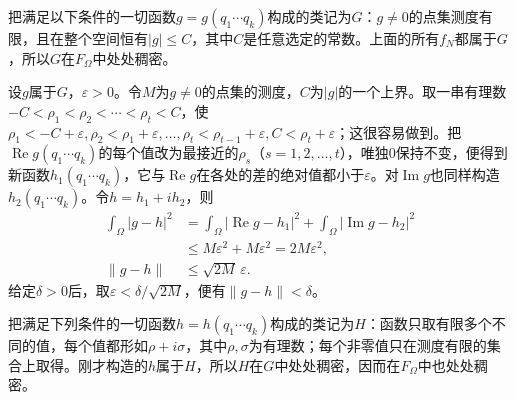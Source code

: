 \documentclass[fontsize=13pt,twoside,openany,headings=normal,parskip=false,bookmarkpackage=false,DIV=calc]{scrbook}
\begin{document}
把满足以下条件的一切函数$g=g(q_1\cdots q_k)$构成的类记为$G$：$g\ne0$的点集测度有限，且在整个空间恒有$|g|\leq C$，其中$C$是任意选定的常数。上面的所有$f_N$都属于$G$，所以$G$在$F_\Omega$中处处稠密。

设$g$属于$G$，$\varepsilon>0$。令$M$为$g\ne0$的点集的测度，$C$为$|g|$的一个上界。取一串有理数$-C<\rho_1<\rho_2<\cdots<\rho_t<C$，使$\rho_1<-C+\varepsilon,\allowbreak \rho_2<\rho_1+\varepsilon,\allowbreak \ldots,\allowbreak \rho_t<\rho_{t-1}+\varepsilon,\allowbreak C<\rho_t+\varepsilon$；这很容易做到。把$\operatorname{Re}g(q_1\cdots q_k)$的每个值改为最接近的$\rho_s$（$s=1,\allowbreak 2,\allowbreak \ldots,\allowbreak t$），唯独$0$保持不变，便得到新函数$h_1(q_1\cdots q_k)$，它与$\operatorname{Re}g$在各处的差的绝对值都小于$\varepsilon$。对$\operatorname{Im}g$也同样构造$h_2(q_1\cdots q_k)$。令$h=h_1+ih_2$，则
\begin{align*}
\int_\Omega|g-h|^2
&=\int_\Omega|\operatorname{Re}g-h_1|^2+\int_\Omega|\operatorname{Im}g-h_2|^2\\
&\leq M\varepsilon^2+M\varepsilon^2=2M\varepsilon^2,\\
\|g-h\|&\leq\sqrt{2M}\,\varepsilon.
\end{align*}
给定$\delta>0$后，取$\varepsilon<\delta/\sqrt{2M}$，便有$\|g-h\|<\delta$。

\hypertarget{origpage-35}{}\label{origpage-35}把满足下列条件的一切函数$h=h(q_1\cdots q_k)$构成的类记为$H$：函数只取有限多个不同的值，每个值都形如$\rho+i\sigma$，其中$\rho,\allowbreak \sigma$为有理数；每个非零值只在测度有限的集合上取得。刚才构造的$h$属于$H$，所以$H$在$G$中处处稠密，因而在$F_\Omega$中也处处稠密。
\end{document}
